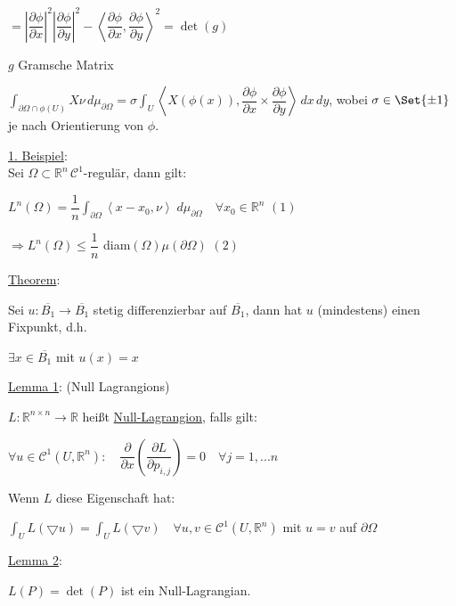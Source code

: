 \documentclass[11pt]{memoir}
\newcommand{\dom}{\partial\Omega}
\newcommand{\pax}{\partial x}
\newcommand{\pay}{\partial y}
\newcommand{\pap}{\partial\phi}
\begin{document}
$= |\dfrac{\pap}{\pax}|^2|\dfrac{\pap}{\pay}|^2  - \left\langle\dfrac{\partial \phi}{\partial x} , \dfrac{\partial \phi}{\partial y}\right\rangle^2 = \det(g)$

\par\bigskip

$g$ Gramsche Matrix

$\int_{\partial \Omega \cap \phi(U)} X \nu \, d\mu_{\partial\Omega} = \sigma \int_U \left\langle X(\phi(x)), \dfrac{\partial \phi}{\partial x} \times \dfrac{\partial \phi}{\partial y}\right\rangle \, dx \, dy$,
wobei $\sigma \in \Set{\pm 1}$ je nach Orientierung von $\phi$.

\par\bigskip

\underline{1. Beispiel}: \\
Sei $\Omega \subset \mathbb R^n \, \mathscr C^1$-regulär, dann gilt:
\begin{center}
	$L^n(\Omega) = \dfrac{1}{n} \int_{\partial \Omega} \left\langle x - x_0, \nu\right\rangle \; d\mu_{\partial\Omega} \quad \forall x_0 \in \mathbb R^n$ \quad $(1)$
\end{center}
\begin{center}
	$\Rightarrow L^n(\Omega) \leq \dfrac{1}{n}$ diam$(\Omega) \mu(\partial\Omega)$ \quad $(2)$
\end{center}


\par\bigskip
\underline{Theorem}: 
\par
Sei $u: \overline{B_1} \rightarrow \overline{B_1}$ stetig differenzierbar auf $\overline{B_1}$, dann hat $u$ (mindestens) einen Fixpunkt, d.h.
\begin{center}
	$\exists x \in \overline{B_1}$ mit $u(x) = x$
\end{center}

\par\bigskip

\underline{Lemma 1}: (Null Lagrangions) 
\par
$L: \mathbb R^{n \times n} \rightarrow \mathbb R$ heißt \underline{Null-Lagrangion}, falls gilt:
\begin{center}
	$\forall u \in \mathscr C^1(U, \mathbb R^n): \quad \dfrac{\partial}{\partial x} \left( \dfrac{\partial L}{\partial p_{i,j}}\right) = 0 \quad \forall j = 1,... n$
\end{center}
Wenn $L$ diese Eigenschaft hat:
\begin{center}
	$\int_U L(\bigtriangledown u) = \int_U L(\bigtriangledown v) \quad \forall u, v \in \mathscr C^1(U, \mathbb R^n)$ mit $u = v$ auf $\dom$
\end{center}


\underline{Lemma 2}: 
\par
$L(P) = \det (P)$ ist ein Null-Lagrangian.
\end{document}

